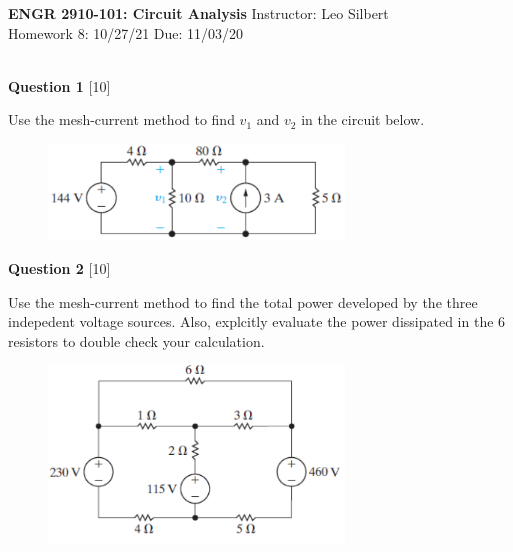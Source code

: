 \documentclass[12pt]{article}
\begin{document}

\begin{center}
\hfil
{\large\bf {ENGR 2910-101: Circuit Analysis}}
\hfill Instructor: Leo Silbert \\
Homework 8: 10/27/21 \hfill Due: 11/03/20\\
\hrulefill\\
\end{center}




\noindent
{\bf Question 1} [10]

Use the mesh-current method to find $v_{1}$ and $v_{2}$ in the circuit below.
\begin{figure}[h!]
     \centering
\vspace{-0.1in}
     \includegraphics[clip,width=0.7\textwidth]{Fig4-11.png}
\vspace{-0.15in}
\end{figure}


\noindent
{\bf Question 2} [10]

Use the mesh-current method to find the total power developed by the three indepedent voltage sources. Also, explcitly evaluate the power dissipated in the 6 resistors to double check your calculation.
\begin{figure}[h!]
     \centering
\vspace{-0.1in}
     \includegraphics[clip,width=0.7\textwidth]{Fig4-37.png}
\vspace{-0.15in}
\end{figure}
\end{document}
